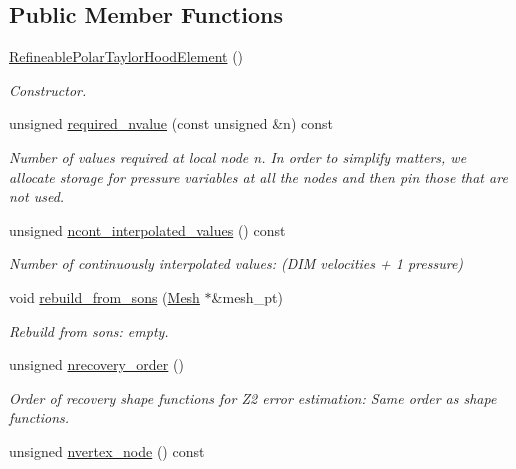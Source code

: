 \subsection*{Public Member Functions}
\begin{DoxyCompactItemize}
\item 
\hyperlink{classoomph_1_1RefineablePolarTaylorHoodElement_aa9ed1c76464ca63fe5afaf5bea1d2fd2}{Refineable\+Polar\+Taylor\+Hood\+Element} ()
\begin{DoxyCompactList}\small\item\em Constructor. \end{DoxyCompactList}\item 
unsigned \hyperlink{classoomph_1_1RefineablePolarTaylorHoodElement_aa04615fc715f41d0d4e32d6f9b22e444}{required\+\_\+nvalue} (const unsigned \&n) const
\begin{DoxyCompactList}\small\item\em Number of values required at local node n. In order to simplify matters, we allocate storage for pressure variables at all the nodes and then pin those that are not used. \end{DoxyCompactList}\item 
unsigned \hyperlink{classoomph_1_1RefineablePolarTaylorHoodElement_a2920bff5873ab548bee53764784a8aa1}{ncont\+\_\+interpolated\+\_\+values} () const
\begin{DoxyCompactList}\small\item\em Number of continuously interpolated values\+: (D\+IM velocities + 1 pressure) \end{DoxyCompactList}\item 
void \hyperlink{classoomph_1_1RefineablePolarTaylorHoodElement_a0ef3766f870b55585a8de7c0cc32a1dd}{rebuild\+\_\+from\+\_\+sons} (\hyperlink{classoomph_1_1Mesh}{Mesh} $\ast$\&mesh\+\_\+pt)
\begin{DoxyCompactList}\small\item\em Rebuild from sons\+: empty. \end{DoxyCompactList}\item 
unsigned \hyperlink{classoomph_1_1RefineablePolarTaylorHoodElement_ace9784b01dd7184410c22588334238e0}{nrecovery\+\_\+order} ()
\begin{DoxyCompactList}\small\item\em Order of recovery shape functions for Z2 error estimation\+: Same order as shape functions. \end{DoxyCompactList}\item 
unsigned \hyperlink{classoomph_1_1RefineablePolarTaylorHoodElement_a227872425bda8de11fd94b625eeffbd0}{nvertex\+\_\+node} () const

\end{DoxyCompactItemize}
